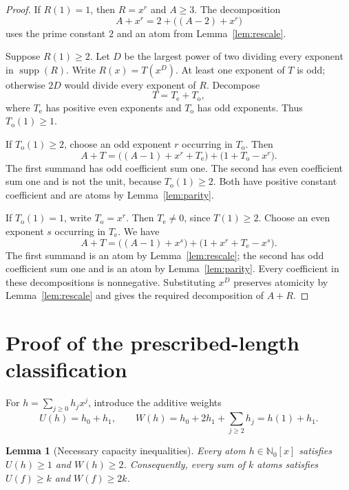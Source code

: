 \documentclass[11pt]{amsart}
\newcommand{\Nzero}{\mathbb N_0}
\DeclareMathOperator{\supp}{supp}
\newtheorem{lemma}[theorem]{Lemma}
\theoremstyle{definition}
\theoremstyle{remark}
\begin{document}
\begin{proof}
If $R(1)=1$, then $R=x^r$ and $A\ge3$. The decomposition
\[
A+x^r=2+\bigl((A-2)+x^r\bigr)
\]
uses the prime constant $2$ and an atom from Lemma~\ref{lem:rescale}.

Suppose $R(1)\ge2$. Let $D$ be the largest power of two dividing every
exponent in $\supp(R)$. Write $R(x)=T(x^D)$. At least one exponent of
$T$ is odd; otherwise $2D$ would divide every exponent of $R$.
Decompose
\[
T=T_{\mathrm e}+T_{\mathrm o},
\]
where $T_{\mathrm e}$ has positive even exponents and $T_{\mathrm o}$ has
odd exponents. Thus $T_{\mathrm o}(1)\ge1$.

If $T_{\mathrm o}(1)\ge2$, choose an odd exponent $r$ occurring in
$T_{\mathrm o}$. Then
\begin{equation}\label{eq:split-odd}
A+T=
\bigl((A-1)+x^r+T_{\mathrm e}\bigr)
+\bigl(1+T_{\mathrm o}-x^r\bigr).
\end{equation}
The first summand has odd coefficient sum one. The second has even
coefficient sum one and is not the unit, because
$T_{\mathrm o}(1)\ge2$. Both have positive constant coefficient and are
atoms by Lemma~\ref{lem:parity}.

If $T_{\mathrm o}(1)=1$, write $T_{\mathrm o}=x^r$. Then
$T_{\mathrm e}\ne0$, since $T(1)\ge2$. Choose an even exponent $s$
occurring in $T_{\mathrm e}$. We have
\begin{equation}\label{eq:split-even}
A+T=
\bigl((A-1)+x^s\bigr)
+\bigl(1+x^r+T_{\mathrm e}-x^s\bigr).
\end{equation}
The first summand is an atom by Lemma~\ref{lem:rescale}; the second has
odd coefficient sum one and is an atom by Lemma~\ref{lem:parity}.
Every coefficient in these decompositions is nonnegative. Substituting
$x^D$ preserves atomicity by Lemma~\ref{lem:rescale} and gives the
required decomposition of $A+R$.
\end{proof}

\section{Proof of the prescribed-length classification}

For $h=\sum_{j\ge0}h_jx^j$, introduce the additive weights
\begin{equation}\label{eq:weights}
U(h)=h_0+h_1,\qquad
W(h)=h_0+2h_1+\sum_{j\ge2}h_j=h(1)+h_1.
\end{equation}

\begin{lemma}[Necessary capacity inequalities]\label{lem:capacity}
Every atom $h\in\Nzero[x]$ satisfies $U(h)\ge1$ and $W(h)\ge2$.
Consequently, every sum of $k$ atoms satisfies $U(f)\ge k$ and
$W(f)\ge2k$.
\end{lemma}
\end{document}
